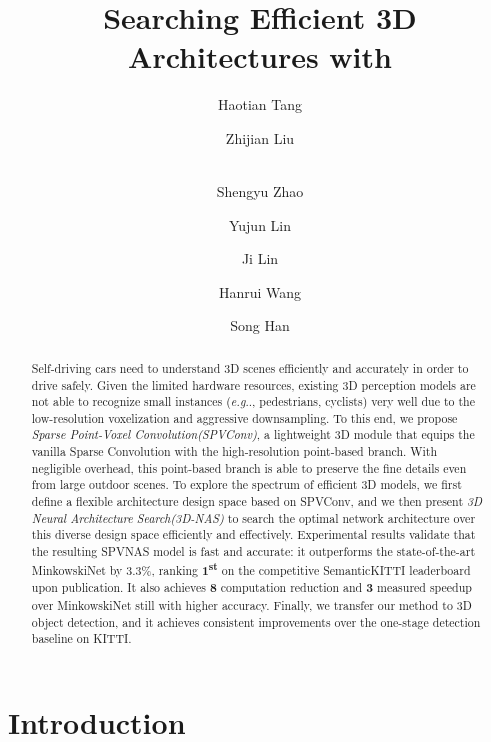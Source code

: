 \documentclass[runningheads]{llncs}
\title{Searching Efficient 3D Architectures with \\ \module}
\author{Haotian Tang \and Zhijian Liu \and \\ Shengyu Zhao \and Yujun Lin \and Ji Lin \and Hanrui Wang \and Song Han}
\institute{ Massachusetts Institute of Technology \\  IIIS, Tsinghua University}
\makeatletter
\DeclareRobustCommand\onedot{\futurelet\@let@token\@onedot}
\def\@onedot{\ifx\@let@token.\else.\null\fi\xspace}
\def\eg{\emph{e.g}\onedot} \def\Eg{\emph{E.g}\onedot}
\def\module{Sparse Point-Voxel Convolution\xspace}
\def\moduleshort{SPVConv\xspace}
\def\modelshort{SPVNAS\xspace}
\def\nas{3D Neural Architecture Search\xspace}
\def\nasshort{3D-NAS\xspace}
\makeatother
\begin{document}
\pagestyle{headings}
\mainmatter

\maketitle


\begin{abstract}

Self-driving cars need to understand 3D scenes efficiently and accurately in order to drive safely. Given the limited hardware resources, existing 3D perception models are not able to recognize small instances (\eg, pedestrians, cyclists) very well due to the low-resolution voxelization and aggressive downsampling. To this end, we propose \emph{\module (\moduleshort)}, a lightweight 3D module that equips the vanilla Sparse Convolution with the high-resolution point-based branch. With negligible overhead, this point-based branch is able to preserve the fine details even from large outdoor scenes. To explore the spectrum of efficient 3D models, we first define a flexible architecture design space based on \moduleshort, and we then present \emph{\nas (\nasshort)} to search the optimal network architecture over this diverse design space efficiently and effectively. Experimental results validate that the resulting \modelshort model is fast and accurate: it outperforms the state-of-the-art MinkowskiNet by 3.3\%, ranking \textbf{1\textsuperscript{st}} on the competitive SemanticKITTI leaderboard upon publication. It also achieves \textbf{8} computation reduction and \textbf{3} measured speedup over MinkowskiNet still with higher accuracy. Finally, we transfer our method to 3D object detection, and it achieves consistent improvements over the one-stage detection baseline on KITTI.

\end{abstract} \section{Introduction}
\end{document}
